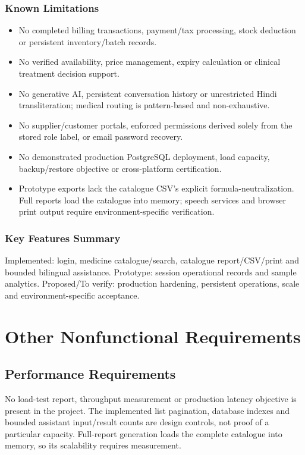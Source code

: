 \documentclass[11pt,a4paper]{article}
\newcommand{\SummaryBox}[1]{\par\noindent\colorbox{uiFill}{\parbox{\dimexpr\linewidth-2\fboxsep\relax}{\small\sffamily #1}}\par}
\begin{document}
\subsubsection{Known Limitations}
\begin{itemize}
\item No completed billing transactions, payment/tax processing, stock deduction or persistent inventory/batch records.
\item No verified availability, price management, expiry calculation or clinical treatment decision support.
\item No generative AI, persistent conversation history or unrestricted Hindi transliteration; medical routing is pattern-based and non-exhaustive.
\item No supplier/customer portals, enforced permissions derived solely from the stored role label, or email password recovery.
\item No demonstrated production PostgreSQL deployment, load capacity, backup/restore objective or cross-platform certification.
\item Prototype exports lack the catalogue CSV's explicit formula-neutralization. Full reports load the catalogue into memory; speech services and browser print output require environment-specific verification.
\end{itemize}

\subsubsection{Key Features Summary}
\SummaryBox{Implemented: login, medicine catalogue/search, catalogue report/CSV/print and bounded bilingual assistance. Prototype: session operational records and sample analytics. Proposed/To verify: production hardening, persistent operations, scale and environment-specific acceptance.}

\clearpage
\section{Other Nonfunctional Requirements}
\subsection{Performance Requirements}
No load-test report, throughput measurement or production latency objective is present in the project. The implemented list pagination, database indexes and bounded assistant input/result counts are design controls, not proof of a particular capacity. Full-report generation loads the complete catalogue into memory, so its scalability requires measurement.
\end{document}
